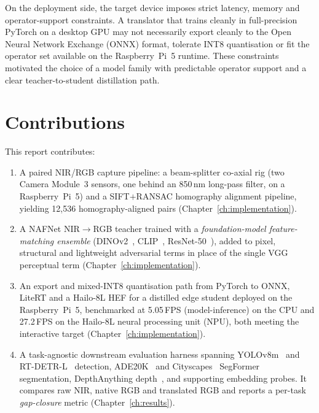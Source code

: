 On the deployment side, the target device imposes strict latency, memory and operator-support constraints. A translator that trains cleanly in full-precision PyTorch on a desktop GPU may not necessarily export cleanly to the Open Neural Network Exchange (ONNX) format, tolerate INT8 quantisation or fit the operator set available on the Raspberry~Pi~5 runtime. These constraints motivated the choice of a model family with predictable operator support and a clear teacher-to-student distillation path.

\section{Contributions}
\label{sec:intro_contributions}

This report contributes:
\begin{enumerate}
    \item A paired NIR/RGB capture pipeline: a beam-splitter co-axial rig (two Camera Module~3 sensors, one behind an 850\,nm long-pass filter, on a Raspberry~Pi~5) and a SIFT$+$RANSAC homography alignment pipeline, yielding 12{,}536 homography-aligned pairs (Chapter~\ref{ch:implementation}).
    \item A NAFNet NIR$\rightarrow$RGB teacher trained with a \emph{foundation-model feature-matching ensemble} (DINOv2~\cite{oquab2024dinov2}, CLIP~\cite{radford2021clip}, ResNet-50~\cite{he2016resnet}), added to pixel, structural and lightweight adversarial terms in place of the single VGG perceptual term (Chapter~\ref{ch:implementation}).
    \item An export and mixed-INT8 quantisation path from PyTorch to ONNX, LiteRT and a Hailo-8L HEF for a distilled edge student deployed on the Raspberry~Pi~5, benchmarked at 5.05\,FPS (model-inference) on the CPU and 27.2\,FPS on the Hailo-8L neural processing unit (NPU), both meeting the interactive target (Chapter~\ref{ch:implementation}).
    \item A task-agnostic downstream evaluation harness spanning YOLOv8m~\cite{jocher2023yolov8} and RT-DETR-L~\cite{zhao2024rtdetr} detection, ADE20K~\cite{zhou2017ade20k} and Cityscapes~\cite{cordts2016cityscapes} SegFormer~\cite{xie2021segformer} segmentation, DepthAnything depth~\cite{yang2024depthanything}, and supporting embedding probes. It compares raw NIR, native RGB and translated RGB and reports a per-task \emph{gap-closure} metric (Chapter~\ref{ch:results}).
\end{enumerate}


